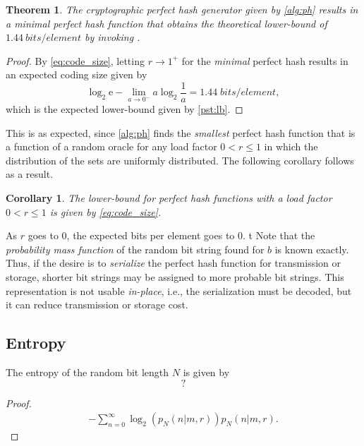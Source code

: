 \documentclass[hidelinks,11pt,final]{article}
\newcommand{\envnumstyle}{section}
\theoremstyle{plain}
\newtheorem{theorem}{Theorem}[\envnumstyle]
\newtheorem{corollary}{Corollary}[theorem]
\begin{document}
\begin{theorem}
The cryptographic perfect hash generator given by \cref{alg:ph} results in a \emph{minimal} perfect hash function that obtains the theoretical lower-bound of $\SI{1.44}{bits \per element}$ by invoking .
\end{theorem}
\begin{proof}
By \cref{eq:code_size}, letting $r \to 1^{+}$ for the \emph{minimal} perfect hash results in an expected coding size given by
\begin{equation}
    \log_2 \mathrm{e} - \lim_{a \to 0^{-}} a \log_2 \frac{1}{a} = 1.44 \; \si{bits \per element},
\end{equation}
which is the expected lower-bound given by \cref{pst:lb}.
\end{proof}
This is as expected, since \cref{alg:ph} finds the \emph{smallest} perfect hash function that is a function of a random oracle for any load factor $0 < r \leq 1$ in which the distribution of the sets are uniformly distributed. The following corollary follows as a result.
\begin{corollary}
The lower-bound for perfect hash functions with a load factor $0 < r \leq 1$ is given by \cref{eq:code_size}.
\end{corollary}
As $r$ goes to $0$, the expected bits per element goes to $0$.
t
Note that the \emph{probability mass function} of the random bit string found for $b$ is known exactly. Thus, if the desire is to \emph{serialize} the perfect hash function for transmission or storage, shorter bit strings may be assigned to more probable bit strings. This representation is not usable \emph{in-place}, i.e., the serialization must be decoded, but it can reduce transmission or storage cost.

\subsection{Entropy}

The entropy of the random bit length $N$ is given by
\begin{equation}
?    
\end{equation}
\begin{proof}
\begin{align}
    -\sum_{n=0}^{\infty} \log_2\!\left(p_N(n | m,r)\right) p_{N}(n | m,r).
\end{align}
\end{proof}
\end{document}
